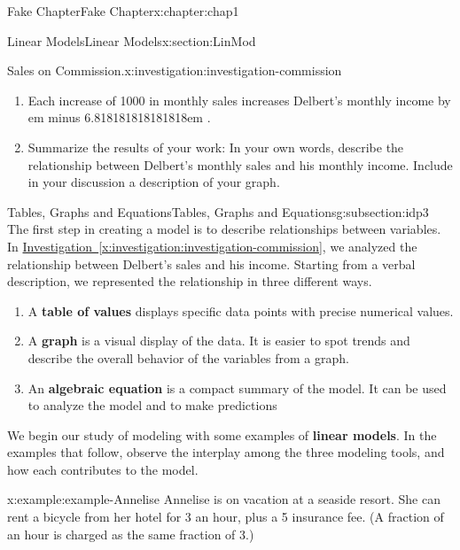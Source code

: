 \documentclass[oneside,10pt,]{book}
\newcommand{\xreffont}{\relax}
\newcommand{\terminology}[1]{\textbf{#1}}
\newcommand{\fillin}[1]{\leavevmode\leaders\vrule height -1.2pt depth 1.5pt \hskip #1em minus #1em \null}
\numberwithin{equation}{section}
\begin{document}
\begin{chapterptx}{Fake Chapter}{}{Fake Chapter}{}{}{x:chapter:chap1}
\begin{sectionptx}{Linear Models}{}{Linear Models}{}{}{x:section:LinMod}
\begin{introduction}{}
\begin{investigation}{Sales on Commission.}{x:investigation:investigation-commission}
\begin{enumerate}
\item{}Each increase of \textdollar{}1000 in monthly sales increases Delbert’s monthly income by \fillin{6.818181818181818}.%
\item{}Summarize the results of your work: In your own words, describe the relationship between Delbert’s monthly sales and his monthly income. Include in your discussion a description of your graph.%
\end{enumerate}
%
\end{investigation}%
\end{introduction}%
%
%
\typeout{************************************************}
\typeout{************************************************}
%
\begin{subsectionptx}{Tables, Graphs and Equations}{}{Tables, Graphs and Equations}{}{}{g:subsection:idp3}
The first step in creating a model is to describe relationships between variables.  In \hyperref[x:investigation:investigation-commission]{Investigation~{\xreffont\ref{x:investigation:investigation-commission}}}, we analyzed the relationship between Delbert's sales and his income.  Starting from a verbal description, we represented the relationship in three different ways.%
\par
%
\begin{enumerate}
\item{}A \terminology{table of values} displays specific data points with precise numerical values.%
\item{}A \terminology{graph} is a visual display of the data.  It is easier to spot trends and describe the overall behavior of the variables from a graph.%
\item{}An \terminology{algebraic equation} is a compact summary of the model.  It can be used to analyze the model and to make predictions%
\end{enumerate}
%
\par
We begin our study of modeling with some examples of \terminology{linear models}.  In the examples that follow, observe the interplay among the three modeling tools, and how each contributes to the model.%
\begin{example}{}{x:example:example-Annelise}%
Annelise is on vacation at a seaside resort.  She can rent a bicycle from her hotel for \textdollar{}3 an hour, plus a \textdollar{}5 insurance fee.  (A fraction of an hour is charged as the same fraction of \textdollar{}3.)%

\end{example}
\end{subsectionptx}
\end{sectionptx}
\end{chapterptx}
\end{document}

